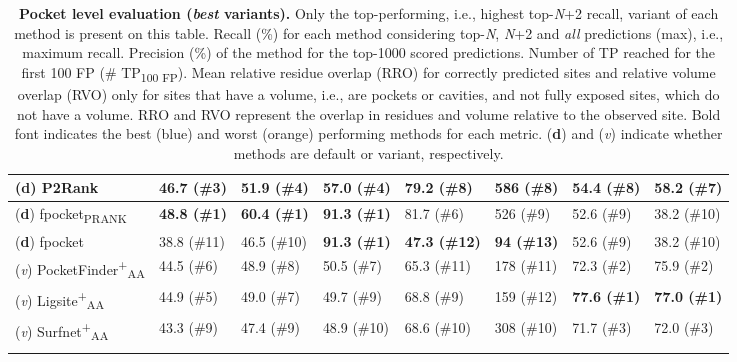 \begin{landscape}
\begin{longtable}[c]{|M{33mm}|M{28mm}|M{31mm}|M{26mm}|M{29mm}|M{19mm}|M{18mm}|M{18mm}|}
\footnotesize{(\textbf{d})} P2Rank             & 46.7 (\#3)           & 51.9 (\#4)             & 57.0 (\#4)           & 79.2 (\#8)           & 586 (\#8)         & 54.4 (\#8)     & 58.2 (\#7)   \\ \hline
\footnotesize{(\textbf{d})} fpocket\textsubscript{PRANK}       & \textbf{\textcolor{CBBlue}{48.8 (\#1)}}           & \textbf{\textcolor{CBBlue}{60.4 (\#1)}} & \textbf{\textcolor{CBBlue}{91.3 (\#1)}}         & 81.7 (\#6)           & 526 (\#9)        & 52.6 (\#9)     & 38.2 (\#10)     \\ \hline
\footnotesize{(\textbf{d})} fpocket        & 38.8 (\#11)           & 46.5 (\#10)             & \textbf{\textcolor{CBBlue}{91.3 (\#1)}}         & \textbf{\textcolor{CBOrange}{47.3 (\#12)}}          & \textbf{\textcolor{CBOrange}{94 (\#13)}}          & 52.6 (\#9)     & 38.2 (\#10)     \\ \hline
\footnotesize{(\textit{v})} PocketFinder\textsuperscript{+}\textsubscript{AA}    & 44.5 (\#6)          & 48.9 (\#8)            & 50.5 (\#7)        & 65.3 (\#11)           & 178 (\#11)         & 72.3 (\#2)     & 75.9 (\#2)     \\ \hline
\footnotesize{(\textit{v})} Ligsite\textsuperscript{+}\textsubscript{AA}         & 44.9 (\#5)          & 49.0 (\#7)              & 49.7 (\#9)        & 68.8 (\#9)          & 159 (\#12)         & \textbf{\textcolor{CBBlue}{77.6 (\#1)}}     & \textbf{\textcolor{CBBlue}{77.0 (\#1)}}     \\ \hline
\footnotesize{(\textit{v})} Surfnet\textsuperscript{+}\textsubscript{AA}         & 43.3 (\#9)          & 47.4 (\#9)            & 48.9 (\#10)        & 68.6 (\#10)          & 308 (\#10)         & 71.7 (\#3)     & 72.0 (\#3)     \\ \hline
\caption[Pocket level evaluation (\textit{best} variants)]{\textbf{Pocket level evaluation (\textit{best} variants).} Only the top-performing, i.e., highest top-\textit{N}+2 recall, variant of each method is present on this table. Recall (\%) for each method considering top-\textit{N}, \textit{N}+2 and \textit{all} predictions (max), i.e., maximum recall. Precision (\%) of the method for the top-1000 scored predictions. Number of TP reached for the first 100 FP (\# TP\textsubscript{100 FP}). Mean relative residue overlap (RRO) for correctly predicted sites and relative volume overlap (RVO) only for sites that have a volume, i.e., are pockets or cavities, and not fully exposed sites, which do not have a volume. RRO and RVO represent the overlap in residues and volume relative to the observed site. Bold font indicates the best (blue) and worst (orange) performing methods for each metric. (\textbf{d}) and (\textit{v}) indicate whether methods are default or variant, respectively.}
\label{tab:pocket_level_benchmark_variants}\\
\end{longtable}
\end{landscape}
\endgroup


